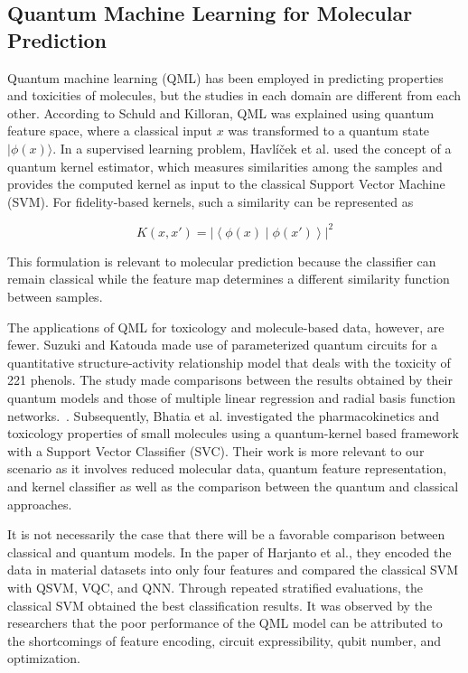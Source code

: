 \documentclass[conference]{IEEEtran}
\begin{document}
\subsection{Quantum Machine Learning for Molecular Prediction}
\label{sec:related-qml}

Quantum machine learning (QML) has been employed in predicting properties and toxicities of molecules, but the studies in each domain are different from each other. According to Schuld and Killoran, QML was explained using quantum feature space, where a classical input \(x\) was transformed to a quantum state \(|\phi(x)\rangle\). In a supervised learning problem, Havlíček et al. used the concept of a quantum kernel estimator, which measures similarities among the samples and provides the computed kernel as input to the classical Support Vector Machine (SVM). For fidelity-based kernels, such a similarity can be represented as

\[
K(x,x') =
\left|
\left\langle
\phi(x)
\middle|
\phi(x')
\right\rangle
\right|^2
\]

This formulation is relevant to molecular prediction because the classifier can remain classical while the feature map determines a different similarity function between samples.~\cite{schuld2019hilbertspaces,havlicek2019quantumfeatures}

The applications of QML for toxicology and molecule-based data, however, are fewer. Suzuki and Katouda made use of parameterized quantum circuits for a quantitative structure-activity relationship model that deals with the toxicity of 221 phenols. The study made comparisons between the results obtained by their quantum models and those of multiple linear regression and radial basis function networks.~\cite{suzuki2020toxicityqml}. Subsequently, Bhatia et al. investigated the pharmacokinetics and toxicology properties of small molecules using a quantum-kernel based framework with a Support Vector Classifier (SVC). Their work is more relevant to our scenario as it involves reduced molecular data, quantum feature representation, and kernel classifier as well as the comparison between the quantum and classical approaches.~\cite{bhatia2023admetox}

It is not necessarily the case that there will be a favorable comparison between classical and quantum models. In the paper of Harjanto et al., they encoded the data in material datasets into only four features and compared the classical SVM with QSVM, VQC, and QNN. Through repeated stratified evaluations, the classical SVM obtained the best classification results. It was observed by the researchers that the poor performance of the QML model can be attributed to the shortcomings of feature encoding, circuit expressibility, qubit number, and optimization.~\cite{harjanto2026comparative}
\end{document}
